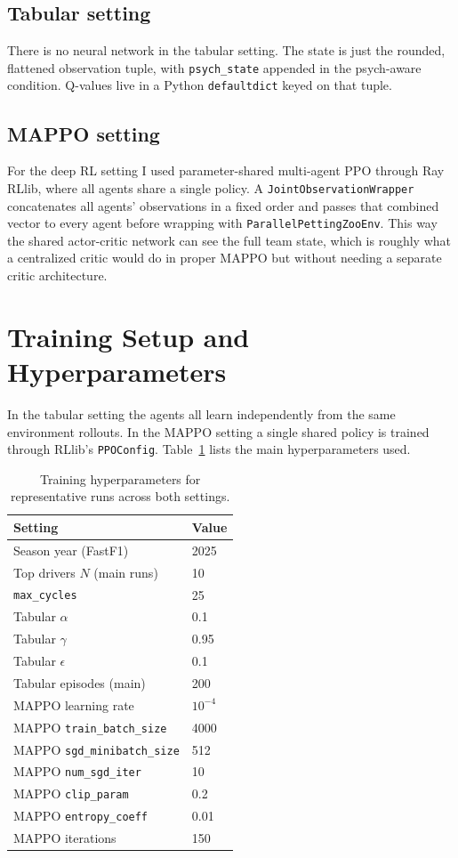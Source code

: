 \documentclass[11pt]{article}
\begin{document}
\subsection*{Tabular setting}
There is no neural network in the tabular setting. The state is just the rounded,
flattened observation tuple, with \texttt{psych\_state} appended in the psych-aware
condition. Q-values live in a Python \texttt{defaultdict} keyed on that tuple.

\subsection*{MAPPO setting}
For the deep RL setting I used parameter-shared multi-agent PPO through Ray RLlib, where
all agents share a single policy. A \texttt{JointObservationWrapper} concatenates all
agents' observations in a fixed order and passes that combined vector to every agent
before wrapping with \texttt{ParallelPettingZooEnv}. This way the shared actor-critic
network can see the full team state, which is roughly what a centralized critic would do
in proper MAPPO but without needing a separate critic architecture.

\section{Training Setup and Hyperparameters}

In the tabular setting the agents all learn independently from the same environment
rollouts. In the MAPPO setting a single shared policy is trained through RLlib's
\texttt{PPOConfig}. Table~\ref{tab:hyper} lists the main hyperparameters used.

\begin{table}[h]
  \caption{Training hyperparameters for representative runs across both settings.}
  \label{tab:hyper}
  \centering
  \begin{tabular}{ll}
    \toprule
    Setting & Value \\
    \midrule
    Season year (FastF1) & 2025 \\
    Top drivers $N$ (main runs) & 10 \\
    \texttt{max\_cycles} & 25 \\
    Tabular $\alpha$ & 0.1 \\
    Tabular $\gamma$ & 0.95 \\
    Tabular $\epsilon$ & 0.1 \\
    Tabular episodes (main) & 200 \\
    MAPPO learning rate & $10^{-4}$ \\
    MAPPO \texttt{train\_batch\_size} & 4000 \\
    MAPPO \texttt{sgd\_minibatch\_size} & 512 \\
    MAPPO \texttt{num\_sgd\_iter} & 10 \\
    MAPPO \texttt{clip\_param} & 0.2 \\
    MAPPO \texttt{entropy\_coeff} & 0.01 \\
    MAPPO iterations & 150 \\
    \bottomrule
  \end{tabular}
\end{table}
\end{document}
